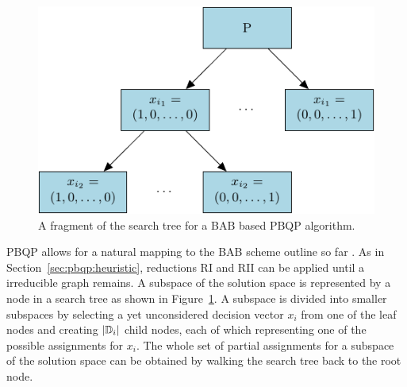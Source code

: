 \begin{figure}
  \begin{center}



    \includegraphics{pgf-fig005}
  \end{center}
  \caption{A fragment of the search tree for a BAB based PBQP algorithm.}
  \label{fig:pbqp:bab-tree}
\end{figure}

PBQP allows for a natural mapping to the BAB scheme outline so far
\cite{DBLP:conf/jmlc/HamesS06}. As in
Section~\ref{sec:pbqp:heuristic}, reductions RI and RII can be applied
until a irreducible graph remains. A subspace of the solution space is
represented by a node in a search tree as shown in
Figure~\ref{fig:pbqp:bab-tree}. A subspace is divided into smaller
subspaces by selecting a yet unconsidered decision vector $x_i$ from
one of the leaf nodes and creating $|\mathbb D_i|$ child nodes, each
of which representing one of the possible assignments for $x_i$. The
whole set of partial assignments for a subspace of the solution space
can be obtained by walking the search tree back to the root node.

